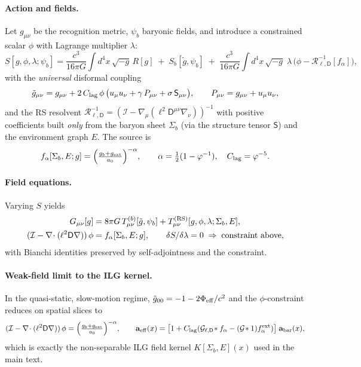\documentclass[fleqn,usenatbib]{mnras}
\begin{document}
\paragraph{Action and fields.} Let $g_{\mu\nu}$ be the recognition metric, $\psi_b$ baryonic fields, and introduce a constrained scalar $\phi$ with Lagrange multiplier $\lambda$:
\begin{equation}
S[g,\phi,\lambda;\psi_b]=\frac{c^3}{16\pi G}\!\int d^4x\,\sqrt{-g}\,R[g]\;+\;S_b[\tilde g,\psi_b]\;+\;\frac{c^3}{16\pi G}\!\int d^4x\,\sqrt{-g}\;\lambda\,\Big(\phi-\mathcal R^{-1}_{\ell,\mathsf D}[f_\alpha]\Big),
\end{equation}
with the \emph{universal} disformal coupling
\begin{equation}
\tilde g_{\mu\nu}=g_{\mu\nu}+2\,C_{\rm lag}\,\phi\,\big(u_\mu u_\nu+\gamma\,P_{\mu\nu}+\sigma\,\mathsf S_{\mu\nu}\big),\qquad P_{\mu\nu}=g_{\mu\nu}+u_\mu u_\nu,
\end{equation}
and the RS resolvent $\mathcal R^{-1}_{\ell,\mathsf D}=(\mathcal I-\nabla_\mu(\ell^2\mathsf D^{\mu\nu}\nabla_\nu))^{-1}$ with positive coefficients built \emph{only} from the baryon sheet $\Sigma_b$ (via the structure tensor $\mathsf S$) and the environment graph $E$. The source is
\begin{equation}
f_\alpha[\Sigma_b,E;g]=\Big(\tfrac{g_b+g_{\rm ext}}{a_0}\Big)^{-\alpha},\qquad \alpha=\tfrac12(1-\varphi^{-1}),\quad C_{\rm lag}=\varphi^{-5}.
\end{equation}

\paragraph{Field equations.} Varying $S$ yields
\begin{align}
G_{\mu\nu}[g]&=8\pi G\,T^{(b)}_{\mu\nu}[\tilde g,\psi_b]+T^{(\rm RS)}_{\mu\nu}[g,\phi,\lambda;\Sigma_b,E],\\
(\mathcal I-\nabla\!\cdot(\ell^2\mathsf D\nabla))\,\phi&=f_\alpha[\Sigma_b,E;g],\qquad \delta S/\delta\lambda=0 \;\Rightarrow\; \text{constraint above},
\end{align}
with Bianchi identities preserved by self-adjointness and the constraint.

\paragraph{Weak-field limit to the ILG kernel.} In the quasi-static, slow-motion regime, $\tilde g_{00}=-1-2\Phi_{\rm eff}/c^2$ and the $\phi$-constraint reduces on spatial slices to
\begin{equation}
(\mathcal I-\nabla\!\cdot(\ell^2\mathsf D\nabla))\,\phi=\Big(\tfrac{g_b+g_{\rm ext}}{a_0}\Big)^{-\alpha},\qquad \mathbf a_{\rm eff}(x)=\big[1+C_{\rm lag}(\mathcal G_{\ell,\mathsf D}\!\ast f_\alpha- (\mathcal G\!\ast 1)f_\alpha^{\rm ext})\big] \;\mathbf a_{\rm bar}(x),
\end{equation}
which is exactly the non-separable ILG field kernel $K[\Sigma_b,E](x)$ used in the main text.
\end{document}

